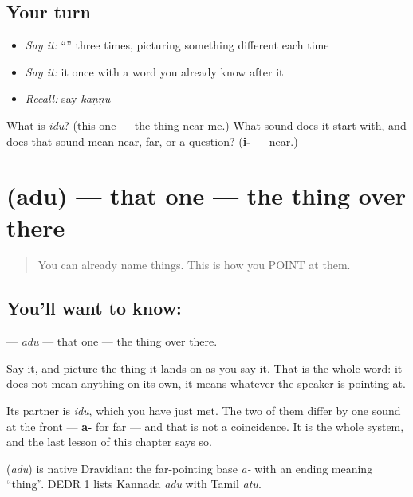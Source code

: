 \subsection*{Your turn}
\begin{itemize}
\raggedright
  \item \emph{Say it:} \textquotedblleft{}\textquotedblright{} three times, picturing something different each time
  \item \emph{Say it:} it once with a word you already know after it
  \item \emph{Recall:} say \emph{kaṇṇu}
\end{itemize}

\begin{tcolorbox}[breakable,colback=teal!4,colframe=teal!35!black,title={Before you move on}]
What is \emph{idu}? (this one — the thing near me.) What sound does it start with, and does that sound mean near, far, or a question? (\textbf{i-} — near.)
\end{tcolorbox}
\section[\texorpdfstring{\kn{ಅದು} (adu)}{ಅದು (adu)}]{ (adu) — that one — the thing over there}

\label{lesson:KA-C41-that}



\begin{quote}
You can already name things. This is how you POINT at them.
\end{quote}

\subsection*{You'll want to know: }
\textbf{} — \emph{adu} — that one — the thing over there.

Say it, and picture the thing it lands on as you say it. That is the whole word: it does not mean anything on its own, it means whatever the speaker is pointing at.

Its partner is \textbf{} \emph{idu}, which you have just met. The two of them differ by one sound at the front — \textbf{a-} for far — and that is not a coincidence. It is the whole system, and the last lesson of this chapter says so.

\begin{cousinweb}
\textbf{} (\emph{adu}) is native Dravidian: the far-pointing base \emph{a-} with an ending meaning \textquotedblleft{}thing\textquotedblright{}. DEDR 1 lists Kannada \emph{adu} with Tamil \emph{atu}.
\end{cousinweb}

